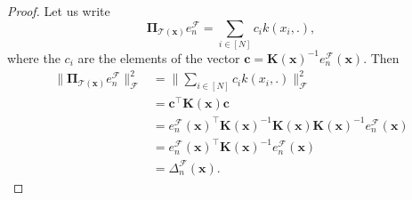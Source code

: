 \documentclass[twoside,11pt]{book}
\numberwithin{theorem}{chapter}
\numberwithin{definition}{chapter}
\numberwithin{proposition}{chapter}
\numberwithin{corollary}{chapter}
\numberwithin{example}{chapter}
\numberwithin{lemma}{chapter}
\numberwithin{assumption}{chapter}
\numberwithin{equation}{chapter}
\numberwithin{figure}{chapter}
\DeclareMathOperator{\Tran}{\intercal}
\newcommand{\pc}[1]{\textcolor{blue}{#1}}
\begin{document}
\begin{proof}
Let us write
\begin{equation}
\bm{\Pi}_{\mathcal{T}(\bm{x})}e_{n}^{\mathcal{F}} = \sum\limits_{i \in [N]} c_{i}k(x_{i},.),
\end{equation}
where the $c_{i}$ are the elements of the vector $\bm{c} = \bm{K}(\bm{x})^{-1}e_{n}^{\mathcal{F}}(\bm{x})$. Then
\begin{align}
\|\bm{\Pi}_{\mathcal{T}(\bm{x})}e_{n}^{\mathcal{F}}\|_{\mathcal{F}}^{2} & =  \|\sum\limits_{i \in [N]} c_{i}k(x_{i},.)\|_{\mathcal{F}}^{2}\\
& =  \bm{c}^{\Tran} \bm{K}(\bm{x})\bm{c} \nonumber\\
& =  e_{n}^{\mathcal{F}}(\bm{x})^{\Tran} \bm{K}(\bm{x})^{-1} \bm{K}(\bm{x}) \bm{K}(\bm{x})^{-1} e_{n}^{\mathcal{F}}(\bm{x}) \nonumber\\
& = e_{n}^{\mathcal{F}}(\bm{x})^{\Tran} \bm{K}(\bm{x})^{-1} e_{n}^{\mathcal{F}}(\bm{x}) \nonumber \\
& = \Delta_{n}^{\mathcal{F}}(\bm{x}) \nonumber.
\end{align}


\end{proof}

%

%
\end{document}
